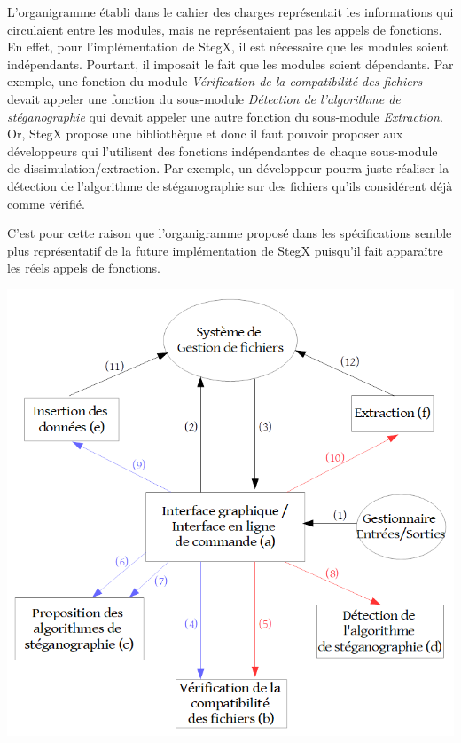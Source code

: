 \documentclass[11pt]{article}
\begin{document}
L'organigramme établi dans le cahier des charges représentait les informations 
qui circulaient entre les modules, mais ne représentaient pas les appels de 
fonctions. 
En effet, pour l'implémentation de StegX, il est nécessaire que les modules 
soient indépendants. Pourtant, il imposait le fait que les modules soient 
dépendants. Par exemple, une fonction du module 
\textit{Vérification de la compatibilité des fichiers} devait appeler une 
fonction du sous-module \textit{Détection de l'algorithme de stéganographie} 
qui devait appeler une autre fonction du sous-module \textit{Extraction}. 
Or, StegX propose une bibliothèque et donc il faut pouvoir proposer aux 
développeurs qui l'utilisent des fonctions indépendantes de chaque sous-module 
de dissimulation/extraction. 
Par exemple, un développeur pourra juste réaliser la détection de l'algorithme de 
stéganographie sur des fichiers qu'ils considérent déjà comme vérifié. 

C'est pour cette raison que l'organigramme proposé dans les spécifications 
semble plus représentatif de la future implémentation de StegX puisqu'il 
fait apparaître les réels appels de fonctions.
\newline

\includegraphics[scale=0.6]{pictures/organigramme2.png}
\newpage
\end{document}
